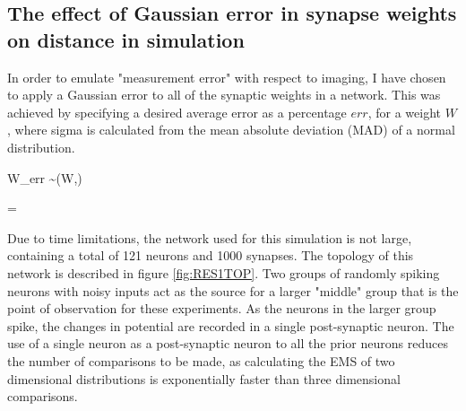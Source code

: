 \subsection{The effect of Gaussian error in synapse weights on distance in simulation}

In order to emulate "measurement error" with respect to imaging, I have chosen
to apply a Gaussian error to all of the synaptic weights in a network. This was
achieved by specifying a desired average error as a percentage $err$, for a
weight $W$, where sigma is calculated from the mean absolute deviation (MAD) of
a normal distribution.

\begin{myequation}
    W_{err} \sim {}(W,\sigma)
\end{myequation}
\begin{myequation}
    \sigma = 
\end{myequation}

Due to time limitations, the network used for this simulation is not large,
containing a total of 121 neurons and 1000 synapses. The topology of this
network is described in figure \ref{fig:RES1TOP}. Two groups of randomly spiking
neurons with noisy inputs act as the source for a larger "middle" group that is
the point of observation for these experiments. As the neurons in the larger
group spike, the changes in potential are recorded in a single post-synaptic
neuron. The use of a single neuron as a post-synaptic neuron to all the prior
neurons reduces the number of comparisons to be made, as calculating the EMS of
two dimensional distributions is exponentially faster than three dimensional
comparisons. 

